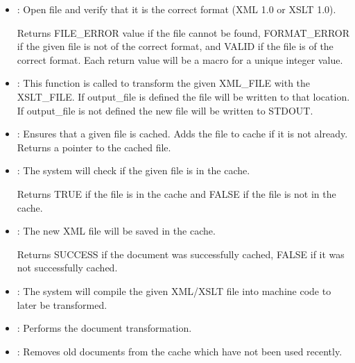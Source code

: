 \begin {itemize}
    \item{
        :
        Open file and verify that it is the correct format (XML 1.0 or XSLT 1.0).

        Returns FILE\_ERROR value if the file cannot be found, FORMAT\_ERROR if the given file is not of the correct format, and VALID if the file is of the correct format.
        Each return value will be a macro for a unique integer value.
    }
    \item{
        :
        This function is called to transform the given XML\_FILE with the XSLT\_FILE.
        If output\_file is defined the file will be written to that location.
        If output\_file is not defined the new file will be written to STDOUT.
    }
    \item{
        :
        Ensures that a given file is cached.
        Adds the file to cache if it is not already.
        Returns a pointer to the cached file.
    }
    \item{
        :
        The system will check if the given file is in the cache.
        
        Returns TRUE if the file is in the cache and FALSE if the file is not in the cache.
    }
    \item{
        :
        The new XML file will be saved in the cache.
        
        Returns SUCCESS if the document was successfully cached, FALSE if it was not successfully cached.
    }
    \item{
        :
        The system will compile the given XML/XSLT file into machine code to later be transformed.
    }
    \item{
        :
        Performs the document transformation.
    }
    \item{
        :
        Removes old documents from the cache which have not been used recently.
    }
\end{itemize}

